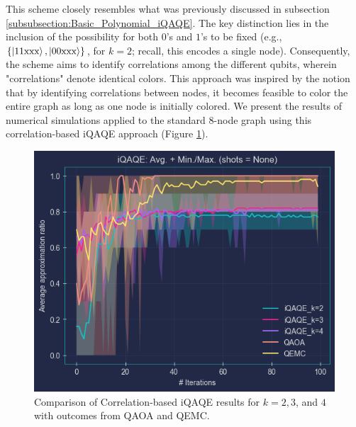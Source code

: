 This scheme closely resembles what was previously discussed in subsection \ref{subsubsection:Basic_Polynomial_iQAQE}. The key distinction lies in the inclusion of the possibility for both $0$'s and $1$'s to be fixed (e.g., $\{\ket{11\text{xxx}}, \ket{00\text{xxx}}\}$, for $k = 2$; recall, this encodes a single node). Consequently, the scheme aims to identify correlations among the different qubits, wherein "correlations" denote identical colors. This approach was inspired by the notion that by identifying correlations between nodes, it becomes feasible to color the entire graph as long as one node is initially colored. We present the results of numerical simulations applied to the standard $8$-node graph using this correlation-based iQAQE approach (Figure \ref{fig:Correlation/k=2,3,4}).



\begin{figure}[H]
    \centering
    \includegraphics[width=0.95\columnwidth]{Figures/Correlation-based/k=2_3_4.png}
    \caption{Comparison of Correlation-based iQAQE results for $k=2, 3$, and $4$ with outcomes from QAOA and QEMC.}
    \label{fig:Correlation/k=2,3,4}
\end{figure}

